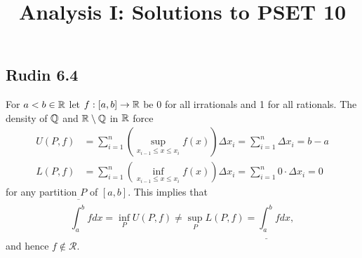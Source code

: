 \documentclass{../mathnotes}
\title{Analysis I: Solutions to PSET 10}
\author{}
\date{}
\begin{document}
\maketitle

\subsection*{Rudin 6.4}
For $a<b\in\mathbb{R}$ let $f:[a,b]\to\mathbb{R}$ be 0 for all irrationals and 1 for all rationals.
The density of $\mathbb{Q}$ and $\mathbb{R}\setminus\mathbb{Q}$ in $\mathbb{R}$ force
\begin{align*}
    U(P,f) &= \sum_{i=1}^n \left(\sup_{x_{i-1}\leq x\leq x_i} f(x)\right)\Delta x_i=\sum_{i=1}^n \Delta x_i=b-a\\
    L(P,f) &= \sum_{i=1}^n \left( \inf_{x_{i-1}\leq x\leq x_i} f(x) \right)\Delta x_i=\sum_{i=1}^n 0\cdot \Delta x_i=0
\end{align*}
for any partition $P$ of $[a,b]$. This implies that
\[\overline{\int_a^b}fdx=\inf_P U(P,f)\neq\sup_P L(P,f)=\underline{\int_a^b}fdx,\]
and hence $f\notin\mathcal{R}$.
\end{document}
